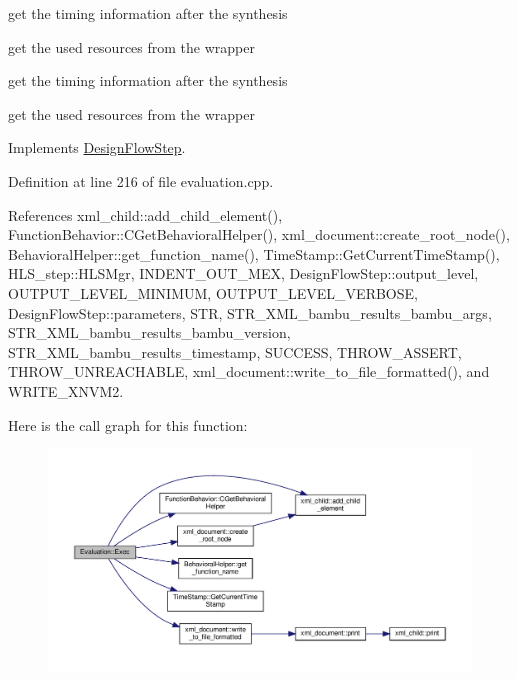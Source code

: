 get the timing information after the synthesis

get the used resources from the wrapper

get the timing information after the synthesis

get the used resources from the wrapper 

Implements \hyperlink{classDesignFlowStep_a77d7e38493016766098711ea24f60b89}{Design\+Flow\+Step}.



Definition at line 216 of file evaluation.\+cpp.



References xml\+\_\+child\+::add\+\_\+child\+\_\+element(), Function\+Behavior\+::\+C\+Get\+Behavioral\+Helper(), xml\+\_\+document\+::create\+\_\+root\+\_\+node(), Behavioral\+Helper\+::get\+\_\+function\+\_\+name(), Time\+Stamp\+::\+Get\+Current\+Time\+Stamp(), H\+L\+S\+\_\+step\+::\+H\+L\+S\+Mgr, I\+N\+D\+E\+N\+T\+\_\+\+O\+U\+T\+\_\+\+M\+EX, Design\+Flow\+Step\+::output\+\_\+level, O\+U\+T\+P\+U\+T\+\_\+\+L\+E\+V\+E\+L\+\_\+\+M\+I\+N\+I\+M\+UM, O\+U\+T\+P\+U\+T\+\_\+\+L\+E\+V\+E\+L\+\_\+\+V\+E\+R\+B\+O\+SE, Design\+Flow\+Step\+::parameters, S\+TR, S\+T\+R\+\_\+\+X\+M\+L\+\_\+bambu\+\_\+results\+\_\+bambu\+\_\+args, S\+T\+R\+\_\+\+X\+M\+L\+\_\+bambu\+\_\+results\+\_\+bambu\+\_\+version, S\+T\+R\+\_\+\+X\+M\+L\+\_\+bambu\+\_\+results\+\_\+timestamp, S\+U\+C\+C\+E\+SS, T\+H\+R\+O\+W\+\_\+\+A\+S\+S\+E\+RT, T\+H\+R\+O\+W\+\_\+\+U\+N\+R\+E\+A\+C\+H\+A\+B\+LE, xml\+\_\+document\+::write\+\_\+to\+\_\+file\+\_\+formatted(), and W\+R\+I\+T\+E\+\_\+\+X\+N\+V\+M2.

Here is the call graph for this function\+:
\nopagebreak
\begin{figure}[H]
\begin{center}
\leavevmode
\includegraphics[width=350pt]{dd/d82/classEvaluation_a74f7914b49ce8c21b264857eb5c2d81d_cgraph}
\end{center}
\end{figure}
\mbox{\label{classEvaluation_a036dd1c9ae9fe7d5e255eb9300bf9e5f}} 
